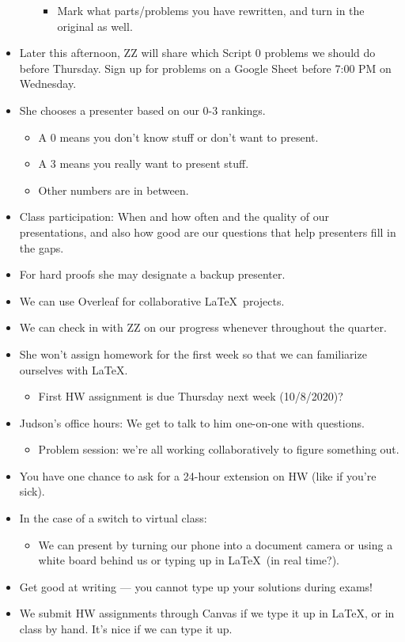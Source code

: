 \documentclass[titlepage]{article}
\begin{document}
\begin{itemize}
\begin{itemize}
        \begin{itemize}
            \item Mark what parts/problems you have rewritten, and turn in the original as well.
        \end{itemize}
    \end{itemize}
    \item Later this afternoon, ZZ will share which Script 0 problems we should do before Thursday. Sign up for problems on a Google Sheet before 7:00 PM on Wednesday.
    \item She chooses a presenter based on our 0-3 rankings.
    \begin{itemize}
        \item A 0 means you don't know stuff or don't want to present.
        \item A 3 means you really want to present stuff.
        \item Other numbers are in between.
    \end{itemize}
    \item Class participation: When and how often and the quality of our presentations, and also how good are our questions that help presenters fill in the gaps.
    \item For hard proofs she may designate a backup presenter.
    \item We can use Overleaf for collaborative \LaTeX\ projects.
    \item We can check in with ZZ on our progress whenever throughout the quarter.
    \item She won't assign homework for the first week so that we can familiarize ourselves with \LaTeX.
    \begin{itemize}
        \item First HW assignment is due Thursday next week (10/8/2020)?
    \end{itemize}
    \item Judson's office hours: We get to talk to him one-on-one with questions.
    \begin{itemize}
        \item Problem session: we're all working collaboratively to figure something out.
    \end{itemize}
    \item You have one chance to ask for a 24-hour extension on HW (like if you're sick).
    \item In the case of a switch to virtual class:
    \begin{itemize}
        \item We can present by turning our phone into a document camera or using a white board behind us or typing up in \LaTeX\ (in real time?).
    \end{itemize}
    \item Get good at writing --- you cannot type up your solutions during exams!
    \item We submit HW assignments through Canvas if we type it up in \LaTeX, or in class by hand. It's nice if we can type it up.
\end{itemize}
\end{document}
